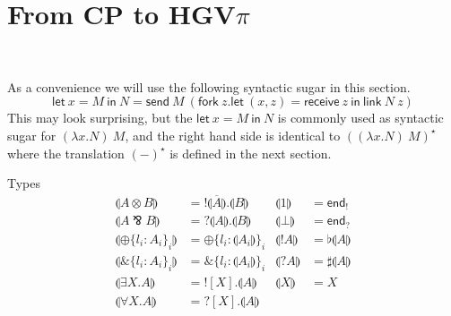 \documentclass{easychair}
\newcommand{\key}{\mathsf}
\newcommand{\set}[1]{\{ #1 \}}
\newcommand{\cptogv}[1]{\llparenthesis{#1}\rrparenthesis}
\newcommand{\row}[2]{\set{#1}_{#2}}
\newcommand{\gvOutput}[2]{\mathord{!}{#1}.{#2}}
\newcommand{\gvInput}[2]{\mathord{?}{#1}.{#2}}
\newcommand{\gvEndOutput}{\key{end}_!}
\newcommand{\gvEndInput}{\key{end}_?}
\newcommand{\gvPlus}[2]{\oplus \row{#1}{#2}}
\newcommand{\gvChoice}[2]{\binampersand \row{#1}{#2}}
\newcommand{\gvServer}[1]{\flat {#1}}
\newcommand{\gvService}[1]{\sharp {#1}}
\newcommand{\gvDual}[1]{\overline{#1}}
\newcommand{\gvOutputType}[2]{![{#1}].{#2}}
\newcommand{\gvInputType}[2]{?[{#1}].{#2}}
\newcommand{\la}{l}
\newcommand{\gvLink}[2]{\key{link}~{#1}~{#2}}
\newcommand{\gvLam}[2]{\lambda {#1}.{#2}}
\newcommand{\gvApp}[2]{{#1}~{#2}}
\newcommand{\gvPair}[2]{({#1},{#2})}
\newcommand{\gvLet}[3]{\key{let}~{#1}={#2}~\key{in}~{#3}}
\newcommand{\gvSend}[2]{\key{send}~{#1}~{#2}}
\newcommand{\gvReceive}[1]{\key{receive}~{#1}}
\newcommand{\gvFork}[2]{\key{fork}~{#1}.{#2}}
\newcommand{\gvReceiveK}[4]{\gvLet{\gvPair{#1}{#2}}{\gvReceive{#3}}{#4}}
\newcommand{\cpTimes}[2]{{#1} \otimes {#2}}
\newcommand{\cpPar}[2]{{#1} \mathbin{\bindnasrepma} {#2}}
\newcommand{\cpPlus}[2]{\oplus \row{#1}{#2}}
\newcommand{\cpWith}[2]{\binampersand \row{#1}{#2}}
\newcommand{\cpOne}{1}
\newcommand{\cpBottom}{\bot}
\newcommand{\cpOfCourse}[1]{!{#1}}
\newcommand{\cpWhyNot}[1]{?{#1}}
\newcommand{\cpExists}[2]{\exists {#1}.{#2}}
\newcommand{\cpForall}[2]{\forall {#1}.{#2}}
\newcommand{\hgvpi}{HGV$\pi$\xspace}
\newcommand{\lampi}[1]{({#1})^\star}
\begin{document}
\section{From CP to \hgvpi}
~

As a convenience we will use the following syntactic sugar in this
section.
\[
\gvLet{x}{M}{N} = \gvSend{M}{(\gvFork{z}{\gvReceiveK{x}{z}{z}{\gvLink{N}{z}}})}
\]
This may look surprising, but the $\gvLet{x}{M}{N}$ is commonly used
as syntactic sugar for $\gvApp{(\gvLam{x}{N})}{M}$, and the right hand
side is identical to $\lampi{\gvApp{(\gvLam{x}{N})}{M}}$ where the
translation $\lampi{-}$ is defined in the next section.

Types
\begin{align*}
\cptogv{\cpTimes{A}{B}} &= \gvOutput{\gvDual{\cptogv{A}}}{\cptogv{B}} & \cptogv{\cpOne} &= \gvEndOutput \\
\cptogv{\cpPar{A}{B}} &= \gvInput{\cptogv{A}}{\cptogv{B}} & \cptogv{\cpBottom} &= \gvEndInput \\
\cptogv{\cpPlus{\la_i:A_i}{i}} &= \gvPlus{\la_i:\cptogv{A_i}}{i} & \cptogv{\cpOfCourse{A}} &= \gvServer{\cptogv{A}} \\
\cptogv{\cpWith{\la_i:A_i}{i}} &= \gvChoice{\la_i:\cptogv{A_i}}{i} & \cptogv{\cpWhyNot{A}} &= \gvService{\cptogv{A}} \\
\cptogv{\cpExists{X}{A}} &= \gvOutputType{X}{\cptogv{A}} & \cptogv{X} &= X \\
\cptogv{\cpForall{X}{A}} &= \gvInputType{X}{\cptogv{A}} \\
\end{align*}
\end{document}
